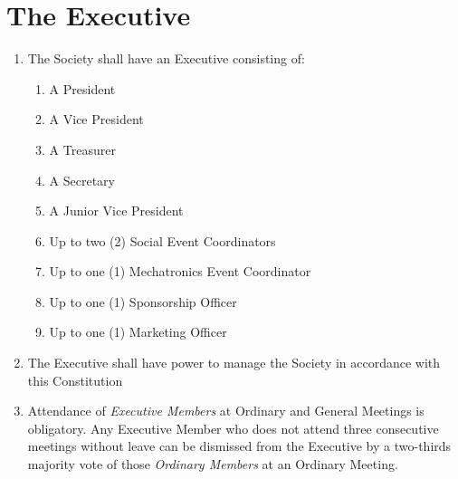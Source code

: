 \documentclass[11pt]{article}
\begin{document}
\section{The Executive}
\begin{enumerate}[\thesection .1]
    \item The Society shall have an Executive consisting of:
    \begin{enumerate}
        \item A President
        \item A Vice President
        \item A Treasurer
        \item A Secretary
        \item A Junior Vice President
        \item Up to two (2) Social Event Coordinators
        \item Up to one (1) Mechatronics Event Coordinator
        \item Up to one (1) Sponsorship Officer
        \item Up to one (1) Marketing Officer
    \end{enumerate}
    \item The Executive shall have power to manage the Society in accordance with this Constitution
    \item Attendance of \textit{Executive Members} at Ordinary and General Meetings is obligatory. Any Executive Member who does not attend three consecutive meetings without leave can be dismissed from the Executive by a two-thirds majority vote of those \textit{Ordinary Members} at an Ordinary Meeting.
\end{enumerate}
\end{document}
